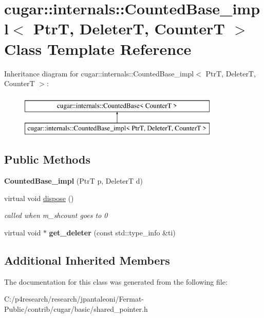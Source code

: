 \hypertarget{classcugar_1_1internals_1_1_counted_base__impl}{}\section{cugar\+:\+:internals\+:\+:Counted\+Base\+\_\+impl$<$ PtrT, DeleterT, CounterT $>$ Class Template Reference}
\label{classcugar_1_1internals_1_1_counted_base__impl}
Inheritance diagram for cugar\+:\+:internals\+:\+:Counted\+Base\+\_\+impl$<$ PtrT, DeleterT, CounterT $>$\+:\begin{figure}[H]
\begin{center}
\leavevmode
\includegraphics[height=2.000000cm]{classcugar_1_1internals_1_1_counted_base__impl}
\end{center}
\end{figure}
\subsection*{Public Methods}
\begin{DoxyCompactItemize}
\item 
\mbox{\label{classcugar_1_1internals_1_1_counted_base__impl_a1a2ba87f11942b1fae4dac06d1a847f2}} 
{\bfseries Counted\+Base\+\_\+impl} (PtrT p, DeleterT d)
\item 
\mbox{\label{classcugar_1_1internals_1_1_counted_base__impl_a5582b40e7ded61b0d1e9b77d2a21b05d}} 
virtual void \hyperlink{classcugar_1_1internals_1_1_counted_base__impl_a5582b40e7ded61b0d1e9b77d2a21b05d}{dispose} ()
\begin{DoxyCompactList}\small\item\em called when m\+\_\+shcount goes to 0 \end{DoxyCompactList}\item 
\mbox{\label{classcugar_1_1internals_1_1_counted_base__impl_aac43f5716a19ea8a300577e14f441744}} 
virtual void $\ast$ {\bfseries get\+\_\+deleter} (const std\+::type\+\_\+info \&ti)
\end{DoxyCompactItemize}
\subsection*{Additional Inherited Members}


The documentation for this class was generated from the following file\+:\begin{DoxyCompactItemize}
\item 
C\+:/p4research/research/jpantaleoni/\+Fermat-\/\+Public/contrib/cugar/basic/shared\+\_\+pointer.\+h\end{DoxyCompactItemize}
